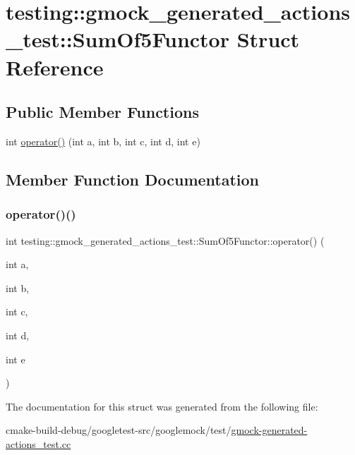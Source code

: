 \hypertarget{structtesting_1_1gmock__generated__actions__test_1_1SumOf5Functor}{}\section{testing\+::gmock\+\_\+generated\+\_\+actions\+\_\+test\+::Sum\+Of5\+Functor Struct Reference}
\label{structtesting_1_1gmock__generated__actions__test_1_1SumOf5Functor}
\subsection*{Public Member Functions}
\begin{DoxyCompactItemize}
\item 
int \mbox{\hyperlink{structtesting_1_1gmock__generated__actions__test_1_1SumOf5Functor_aa3d751efb237e12ecdf1528f2b73da04}{operator()}} (int a, int b, int c, int d, int e)
\end{DoxyCompactItemize}


\subsection{Member Function Documentation}
\mbox{\label{structtesting_1_1gmock__generated__actions__test_1_1SumOf5Functor_aa3d751efb237e12ecdf1528f2b73da04}} 
\subsubsection{\texorpdfstring{operator()()}{operator()()}}
{\footnotesize\ttfamily int testing\+::gmock\+\_\+generated\+\_\+actions\+\_\+test\+::\+Sum\+Of5\+Functor\+::operator() (\begin{DoxyParamCaption}\item[{int}]{a,  }\item[{int}]{b,  }\item[{int}]{c,  }\item[{int}]{d,  }\item[{int}]{e }\end{DoxyParamCaption})\hspace{0.3cm}{\ttfamily [inline]}}



The documentation for this struct was generated from the following file\+:\begin{DoxyCompactItemize}
\item 
cmake-\/build-\/debug/googletest-\/src/googlemock/test/\mbox{\hyperlink{gmock-generated-actions__test_8cc}{gmock-\/generated-\/actions\+\_\+test.\+cc}}\end{DoxyCompactItemize}
